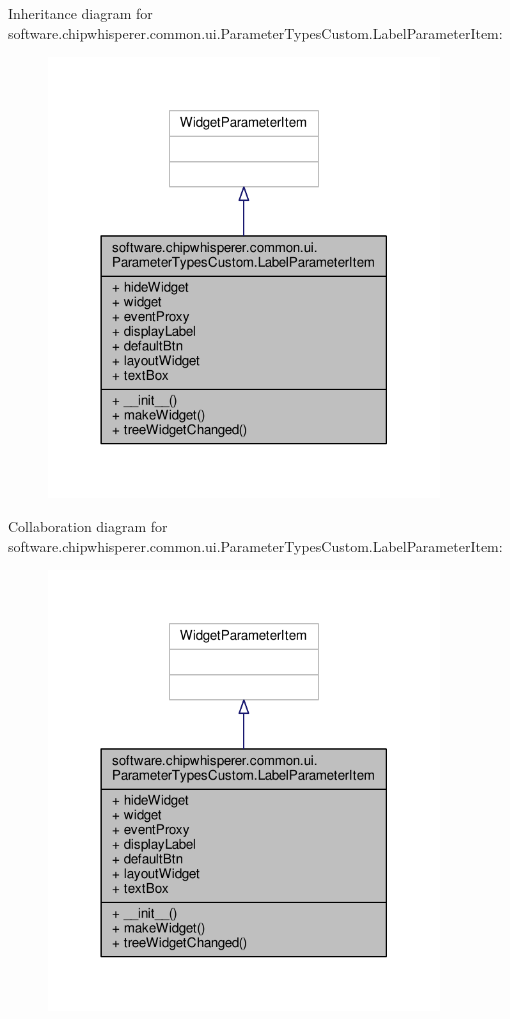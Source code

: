 Inheritance diagram for software.\+chipwhisperer.\+common.\+ui.\+Parameter\+Types\+Custom.\+Label\+Parameter\+Item\+:\nopagebreak
\begin{figure}[H]
\begin{center}
\leavevmode
\includegraphics[width=294pt]{df/ddd/classsoftware_1_1chipwhisperer_1_1common_1_1ui_1_1ParameterTypesCustom_1_1LabelParameterItem__inherit__graph}
\end{center}
\end{figure}


Collaboration diagram for software.\+chipwhisperer.\+common.\+ui.\+Parameter\+Types\+Custom.\+Label\+Parameter\+Item\+:\nopagebreak
\begin{figure}[H]
\begin{center}
\leavevmode
\includegraphics[width=294pt]{d0/d06/classsoftware_1_1chipwhisperer_1_1common_1_1ui_1_1ParameterTypesCustom_1_1LabelParameterItem__coll__graph}
\end{center}
\end{figure}


